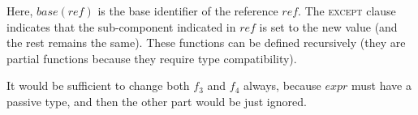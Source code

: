 \documentclass[a4paper]{article}
\begin{document}
\begin{description}
	Here, $\mathit{base}(\mathit{ref})$ is the base identifier of the reference $\mathit{ref}$.
	The \textsc{except} clause indicates that the sub-component indicated in $\mathit{ref}$ is set to the new value
	(and the rest remains the same).
	These functions can be defined recursively
	(they are partial functions because they require type compatibility).

	It would be sufficient to change both $f_3$ and $f_4$ always, because $\mathit{expr}$ must have a passive type,
	and then the other part would be just ignored.












\end{description}
\end{document}
